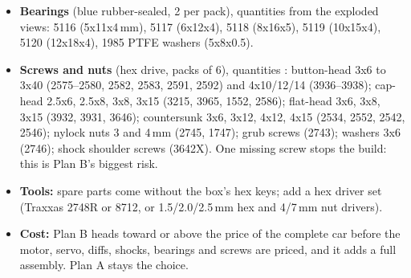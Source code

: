 \documentclass[11pt,a4paper]{article}
\begin{document}
\begin{itemize}
  \item \textbf{Bearings} (blue rubber-sealed, 2 per pack), quantities \tbd{} from the exploded views: 5116 (5x11x4\,mm), 5117 (6x12x4), 5118 (8x16x5), 5119 (10x15x4), 5120 (12x18x4), 1985 PTFE washers (5x8x0.5).
  \item \textbf{Screws and nuts} (hex drive, packs of 6), quantities \tbd: button-head 3x6 to 3x40 (2575--2580, 2582, 2583, 2591, 2592) and 4x10/12/14 (3936--3938); cap-head 2.5x6, 2.5x8, 3x8, 3x15 (3215, 3965, 1552, 2586); flat-head 3x6, 3x8, 3x15 (3932, 3931, 3646); countersunk 3x6, 3x12, 4x12, 4x15 (2534, 2552, 2542, 2546); nylock nuts 3 and 4\,mm (2745, 1747); grub screws (2743); washers 3x6 (2746); shock shoulder screws (3642X). One missing screw stops the build: this is Plan B's biggest risk.
  \item \textbf{Tools:} spare parts come without the box's hex keys; add a hex driver set (Traxxas 2748R or 8712, or 1.5/2.0/2.5\,mm hex and 4/7\,mm nut drivers).
  \item \textbf{Cost:} Plan B heads toward or above the price of the complete car before the motor, servo, diffs, shocks, bearings and screws are priced, and it adds a full assembly. Plan A stays the choice.
\end{itemize}
\end{document}
